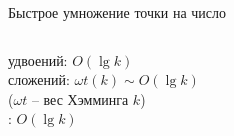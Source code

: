 \documentclass{beamer}
\begin{document}
\begin{frame}{Быстрое умножение точки на число}
\begin{columns}
\begin{column}{0.5\textwidth}
\begin{center}
                \begin{tcolorbox}[enhanced,hbox,colback=box-blue-color!15,colframe=box-blue-color,title=Сложность,center title]
                    \begin{varwidth}{\textwidth}
                            удвоений: $O(\lg k)$ \\
                            сложений: $\omega t(k)\sim O (\lg k)$\\
                            ($\omega t$ -- вес Хэмминга $k$)\\
                            : $O\left( {\lg k} \right)$
                    \end{varwidth}
                \end{tcolorbox}	
            \end{center}
        \end{column}
    \end{columns}
\end{frame}
\end{document}
